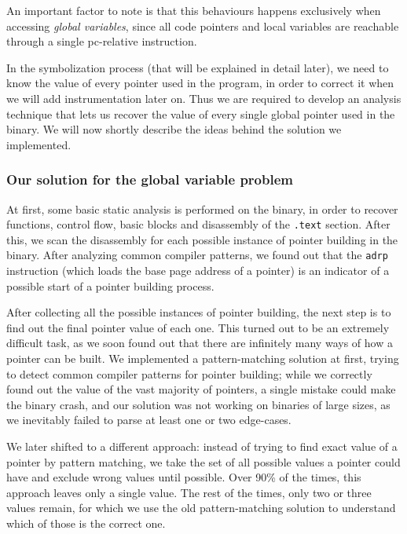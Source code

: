 \documentclass[a4paper,11pt,oneside]{report}
\begin{document}
An important factor to note is that this behaviours happens exclusively when 
accessing \emph{global variables}, since all code pointers and local variables 
are reachable through a single pc-relative instruction. 

In the symbolization process (that will be explained in detail later), we need 
to know the value of every pointer used in the program, in order to correct it 
when we will add instrumentation later on. Thus we are required to develop an 
analysis technique that lets us recover the value of every single global 
pointer used in the binary. We will now shortly describe the ideas behind the 
solution we implemented.

\subsubsection{Our solution for the global variable problem}

At first, some basic static analysis is performed on the binary, in order to 
recover functions, control flow, basic blocks and disassembly of the 
\texttt{.text} section. After this, we scan the disassembly for each possible 
instance of pointer building in the binary. After analyzing common compiler 
patterns, we found out that the \texttt{adrp} instruction (which loads the base 
page address of a pointer) is an indicator of a possible start of a pointer 
building process. 

After collecting all the possible instances of pointer building, the next step 
is to find out the final pointer value of each one. This turned out to be an 
extremely difficult task, as we soon found out that there are infinitely many 
ways of how a pointer can be built. We implemented a pattern-matching solution 
at first, trying to detect common compiler patterns for pointer building; while 
we correctly found out the value of the vast majority of pointers, a single 
mistake could make the binary crash, and our solution was not working on 
binaries of large sizes, as we inevitably failed to parse at least one or two 
edge-cases.

We later shifted to a different approach: instead of trying to find exact value 
of a pointer by pattern matching, we take the set of all possible values a 
pointer could have and exclude wrong values until possible. Over 90\% of the 
times, this approach leaves only a single value. The rest of the times, only 
two or three values remain, for which we use the old pattern-matching solution 
to understand which of those is the correct one. 
\end{document}
